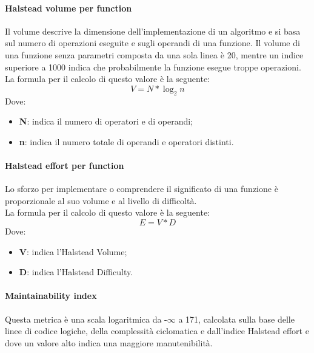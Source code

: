 \documentclass[../NormeDiProgetto.tex]{subfiles}
\begin{document}
			\paragraph{Halstead volume per function}
			Il volume descrive la dimensione dell'implementazione di un algoritmo e si basa sul numero di operazioni eseguite e sugli operandi di una funzione. Il volume di una funzione senza parametri composta da una sola linea è 20, mentre un indice superiore a 1000 indica che probabilmente la funzione esegue troppe operazioni.
				\\La formula per il calcolo di questo valore è la seguente:
				\begin{equation*}
					V = N * \log_{2}{n}
				\end{equation*}
				Dove:
				\begin{itemize}
					\item \textbf{N}: indica il numero di operatori e di operandi;
					\item \textbf{n}: indica il numero totale di operandi e operatori distinti.
				\end{itemize}

			\paragraph{Halstead effort per function}
				Lo sforzo per implementare o comprendere il significato di una funzione è proporzionale al suo volume e al livello di difficoltà.
				\\La formula per il calcolo di questo valore è la seguente:
				\begin{equation*}
					E = V * D
				\end{equation*}
				Dove:
				\begin{itemize}
					\item \textbf{V}: indica l'Halstead Volume;
					\item \textbf{D}: indica l'Halstead Difficulty.
				\end{itemize}
				
			\paragraph{Maintainability index}
			Questa metrica è una scala logaritmica da -$\infty$ a 171, calcolata sulla base delle linee di codice logiche, della complessità ciclomatica e dall'indice Halstead effort e dove un valore alto indica una maggiore manutenibilità.\\
				
\end{document}
